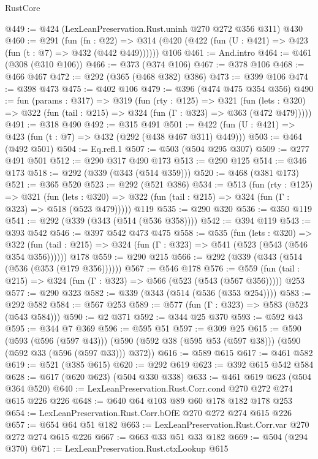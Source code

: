 \begin{lexlean}{RustCore}
\begin{coremodule}
@449 := @424 (LexLeanPreservation.Rust.uninh @270 @272 @356 @311) @430
@460 := @291
    (fun (fn : @22) =>
    @314 (@420 (@422 (fun (U : @421) => @423 (fun (t : @7) => @432 (@442 @449))))))
    @106
@461 := And.intro
@464 := @461 (@308 (@310 @106))
@466 := @373 (@374 @106)
@467 := @378 @106
@468 := @466 @467
@472 := @292 (@365 (@468 @382) @386)
@473 := @399 @106
@474 := @398 @473
@475 := @402 @106
@479 := @396 (@474 @475 @354 @356)
@490 := fun (params : @317) =>
  @319
    (fun (rty : @125) =>
    @321
      (fun (lets : @320) => @322 (fun (tail : @215) => @324 (fun (Γ : @323) => @363 (@472 @479)))))
@491 := @318 @490
@492 := @315 @491
@501 := @422 (fun (U : @421) => @423 (fun (t : @7) => @432 (@292 (@438 @467 @311) @449)))
@503 := @464 (@492 @501)
@504 := Eq.refl.{1}
@507 := @503 (@504 @295 @307)
@509 := @277 @491 @501
@512 := @290 @317 @490 @173
@513 := @290 @125
@514 := @346 @173
@518 := @292 (@339 (@343 (@514 @359)))
@520 := @468 (@381 @173)
@521 := @365 @520
@523 := @292 (@521 @386)
@534 := @513
    (fun (rty : @125) =>
    @321
      (fun (lets : @320) => @322 (fun (tail : @215) => @324 (fun (Γ : @323) => @518 (@523 @479)))))
    @119
@535 := @290 @320
@536 := @350 @119
@541 := @292 (@339 (@343 (@514 (@536 @358))))
@542 := @394 @119
@543 := @393 @542
@546 := @397 @542 @473 @475
@558 := @535
    (fun (lets : @320) =>
    @322 (fun (tail : @215) => @324 (fun (Γ : @323) => @541 (@523 (@543 (@546 @354 @356))))))
    @178
@559 := @290 @215
@566 := @292 (@339 (@343 (@514 (@536 (@353 (@179 @356))))))
@567 := @546 @178
@576 := @559 (fun (tail : @215) => @324 (fun (Γ : @323) => @566 (@523 (@543 (@567 @356))))) @253
@577 := @290 @323
@582 := @339 (@343 (@514 (@536 (@353 @254))))
@583 := @292 @582
@584 := @567 @253
@589 := @577 (fun (Γ : @323) => @583 (@523 (@543 @584)))
@590 := @2 @371
@592 := @344 @25 @370
@593 := @592 @43
@595 := @344 @7 @369
@596 := @595 @51
@597 := @309 @25
@615 := @590
    (@593 (@596 (@597 @43)))
    (@590 (@592 @38 (@595 @53 (@597 @38))) (@590 (@592 @33 (@596 (@597 @33))) @372))
@616 := @589 @615
@617 := @461 @582
@619 := @521 (@385 @615)
@620 := @292 @619
@623 := @392 @615 @542 @584
@628 := @617 (@620 @623) (@504 @330 @338)
@633 := @461 @619 @623 (@504 @364 @520)
@640 := LexLeanPreservation.Rust.Corr.cond @270 @272 @274 @615 @226 @226
@648 := @640 @64 @103 @89 @60 @178 @182 @178 @253
@654 := LexLeanPreservation.Rust.Corr.bOfE @270 @272 @274 @615 @226
@657 := @654 @64 @51 @182
@663 := LexLeanPreservation.Rust.Corr.var @270 @272 @274 @615 @226
@667 := @663 @33 @51 @33 @182
@669 := @504 (@294 @370)
@671 := LexLeanPreservation.Rust.ctxLookup @615

\end{coremodule}
\end{lexlean}
